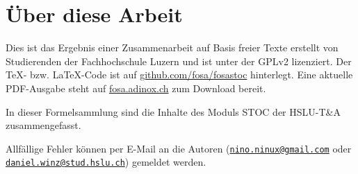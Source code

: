 



\section*{Über diese Arbeit}
Dies ist das Ergebnis einer Zusammenarbeit auf Basis freier Texte erstellt von 
Studierenden der Fachhochschule Luzern und ist unter der GPLv2 lizenziert. Der 
\TeX - bzw. \LaTeX -Code ist auf \url{github.com/fosa/fosastoc} hinterlegt. 
Eine aktuelle PDF-Ausgabe steht auf \url{fosa.adinox.ch} zum Download bereit.

In dieser Formelsammlung sind die Inhalte des Moduls STOC der HSLU-T\&A 
zusammengefasst. 

Allfällige Fehler können per E-Mail an die Autoren 
(\href{mailto:nino.ninux@gmail.com}{\nolinkurl{nino.ninux@gmail.com}} oder 
\href{mailto:daniel.winz@stud.hslu.ch}{\nolinkurl{daniel.winz@stud.hslu.ch}}) 
gemeldet werden. 
